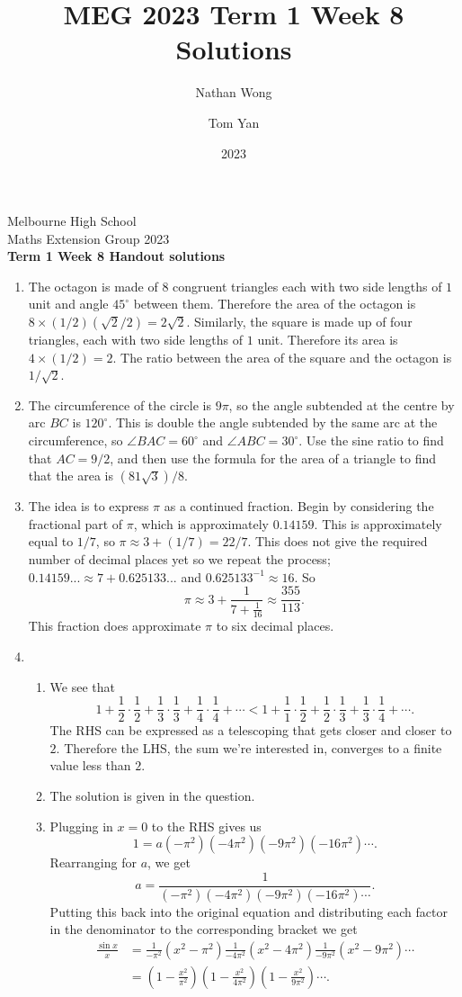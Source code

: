 \documentclass[a4paper,10pt]{article}
\title{MEG 2023 Term 1 Week 8 Solutions}
\author{Nathan Wong\and Tom Yan}
\date{2023}
\newcommand{\thetitle}{Term 1 Week 8 Handout solutions}
\begin{document}
\noindent Melbourne High School\\
Maths Extension Group 2023\\
\textbf{\thetitle}\\
\begin{enumerate}
\item The octagon is made of \(8\) congruent triangles each with
two side lengths of \(1\) unit and angle \(45^\circ\) between them. Therefore the area of the
		octagon is \(8\times(1/2)(\sqrt2/2)=2\sqrt2\). Similarly, the square is made up 
		of four triangles, each with two side lengths of \(1\) unit. Therefore its area
		is \(4\times(1/2)=2\). The ratio between the area of the square and the octagon is \(1/\sqrt2\).
\item The circumference of the circle is \(9\pi\), so the angle subtended at the centre by arc \(BC\) is \(120^\circ\).
	This is double the angle subtended by the same arc at the circumference, so \(\angle BAC=60^\circ\) and
		\(\angle ABC=30^\circ\). Use the sine ratio to find that \(AC=9/2\), and then use the formula
		for the area of a triangle to find that the area is \((81\sqrt3)/8\).
\item The idea is to express \(\pi\) as a continued fraction. Begin by considering the fractional part of \(\pi\), which
	is approximately \(0.14159\). This is approximately equal to \(1/7\), so \(\pi\approx 3+(1/7)=22/7\). This does
		not give the required number of decimal places yet so we repeat the process; \(0.14159...\approx 7+0.625133...\) and \(0.625133^{-1}\approx16\). So \[
			\pi\approx3+\frac{1}{7+\frac{1}{16}}\approx\frac{355}{113}.\]
                      This fraction does approximate \(\pi\) to six decimal places.
\item                      \begin{enumerate}
\item We see that \[1+\frac{1}{2}\cdot\frac{1}{2}+\frac{1}{3}\cdot\frac{1}{3}+\frac{1}{4}\cdot\frac{1}{4}+\cdots<1+\frac{1}{1}\cdot\frac{1}{2}+\frac{1}{2}\cdot\frac{1}{3}+\frac{1}{3}\cdot\frac{1}{4}+\cdots.\]
	The RHS can be expressed as a telescoping that gets closer and closer to \(2\). Therefore
		the LHS, the sum we're interested in, converges to a finite value less than \(2\).
\item The solution is given in the question.
\item Plugging in \(x=0\) to the RHS gives us \[1=a(-\pi^2)(-4\pi^2)(-9\pi^2)(-16\pi^2)\cdots.\]
	Rearranging for \(a\), we get \[a=\frac{1}{(-\pi^2)(-4\pi^2)(-9\pi^2)(-16\pi^2)\cdots}.\]
		Putting this back into the original equation and distributing each factor in the denominator
		to the corresponding bracket we get
		\[
			\begin{split}
				\frac{\sin x}{x}&=\frac{1}{-\pi^2}(x^2-\pi^2)\frac{1}{-4\pi^2}(x^2-4\pi^2)\frac{1}{-9\pi^2}(x^2-9\pi^2)\cdots\\
				&=\left(1-\frac{x^2}{\pi^2}\right)\left(1-\frac{x^2}{4\pi^2}\right)\left(1-\frac{x^2}{9\pi^2}\right)\cdots.
			\end{split}\]


\end{enumerate}
\end{enumerate}
\end{document}
